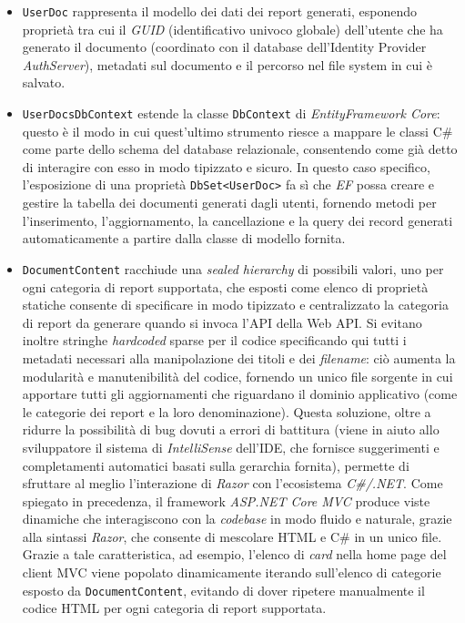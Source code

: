 \begin{itemize}
        \item \texttt{UserDoc} rappresenta il modello dei dati dei report generati, esponendo proprietà tra cui il \emph{GUID} (identificativo univoco globale) dell'utente che ha generato il documento (coordinato con il database dell'Identity Provider \emph{AuthServer}), metadati sul documento e il percorso nel file system in cui è salvato.
        \item \texttt{UserDocsDbContext} estende la classe \texttt{DbContext} di \emph{EntityFramework Core}: questo è il modo in cui quest'ultimo strumento riesce a mappare le classi C\# come parte dello schema del database relazionale, consentendo come già detto di interagire con esso in modo tipizzato e sicuro.
        In questo caso specifico, l'esposizione di una proprietà \texttt{DbSet<UserDoc>} fa sì che \emph{EF} possa creare e gestire la tabella dei documenti generati dagli utenti, fornendo metodi per l'inserimento, l'aggiornamento, la cancellazione e la query dei record generati automaticamente a partire dalla classe di modello fornita.
        \item \texttt{DocumentContent} racchiude una \emph{sealed hierarchy} di possibili valori, uno per ogni categoria di report supportata, che esposti come elenco di proprietà statiche consente di specificare in modo tipizzato e centralizzato la categoria di report da generare quando si invoca l'API della Web API. Si evitano inoltre stringhe \emph{hardcoded} sparse per il codice specificando qui tutti i metadati necessari alla manipolazione dei titoli e dei \emph{filename}: ciò aumenta la modularità e manutenibilità del codice, fornendo un unico file sorgente in cui apportare tutti gli aggiornamenti che riguardano il dominio applicativo (come le categorie dei report e la loro denominazione).
        Questa soluzione, oltre a ridurre la possibilità di bug dovuti a errori di battitura (viene in aiuto allo sviluppatore il sistema di \emph{IntelliSense} dell'IDE, che fornisce suggerimenti e completamenti automatici basati sulla gerarchia fornita), permette di sfruttare al meglio l'interazione di \emph{Razor} con l'ecosistema \emph{C\#/.NET}.
        Come spiegato in precedenza, il framework \emph{ASP.NET Core MVC} produce viste dinamiche che interagiscono con la \emph{codebase} in modo fluido e naturale, grazie alla sintassi \emph{Razor}, che consente di mescolare HTML e C\# in un unico file.
        Grazie a tale caratteristica, ad esempio, l'elenco di \emph{card} nella home page del client MVC viene popolato dinamicamente iterando sull'elenco di categorie esposto da \texttt{DocumentContent}, evitando di dover ripetere manualmente il codice HTML per ogni categoria di report supportata.
\vspace{0.5cm}


\end{itemize}

